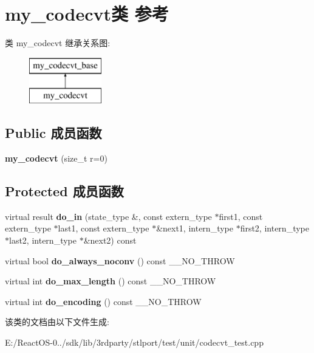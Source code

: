 \hypertarget{classmy__codecvt}{}\section{my\+\_\+codecvt类 参考}
\label{classmy__codecvt}
类 my\+\_\+codecvt 继承关系图\+:\begin{figure}[H]
\begin{center}
\leavevmode
\includegraphics[height=2.000000cm]{classmy__codecvt}
\end{center}
\end{figure}
\subsection*{Public 成员函数}
\begin{DoxyCompactItemize}
\item 
\mbox{\label{classmy__codecvt_ae775b0b64c6cc4574104f2bcab29e134}} 
{\bfseries my\+\_\+codecvt} (size\+\_\+t r=0)
\end{DoxyCompactItemize}
\subsection*{Protected 成员函数}
\begin{DoxyCompactItemize}
\item 
\mbox{\label{classmy__codecvt_a385c743ec5d5d66f03a018fd84d9b015}} 
virtual result {\bfseries do\+\_\+in} (state\+\_\+type \&, const extern\+\_\+type $\ast$first1, const extern\+\_\+type $\ast$last1, const extern\+\_\+type $\ast$\&next1, intern\+\_\+type $\ast$first2, intern\+\_\+type $\ast$last2, intern\+\_\+type $\ast$\&next2) const
\item 
\mbox{\label{classmy__codecvt_a49eed5a59ac12691342c01d7fbe3a36e}} 
virtual bool {\bfseries do\+\_\+always\+\_\+noconv} () const \+\_\+\+\_\+\+N\+O\+\_\+\+T\+H\+R\+OW
\item 
\mbox{\label{classmy__codecvt_a563885278faa8b52924cd0d08946dfe8}} 
virtual int {\bfseries do\+\_\+max\+\_\+length} () const \+\_\+\+\_\+\+N\+O\+\_\+\+T\+H\+R\+OW
\item 
\mbox{\label{classmy__codecvt_ae8d29584f30095fa06ba3d6a768b969e}} 
virtual int {\bfseries do\+\_\+encoding} () const \+\_\+\+\_\+\+N\+O\+\_\+\+T\+H\+R\+OW
\end{DoxyCompactItemize}


该类的文档由以下文件生成\+:\begin{DoxyCompactItemize}
\item 
E\+:/\+React\+O\+S-\/0../sdk/lib/3rdparty/stlport/test/unit/codecvt\+\_\+test.\+cpp\end{DoxyCompactItemize}
